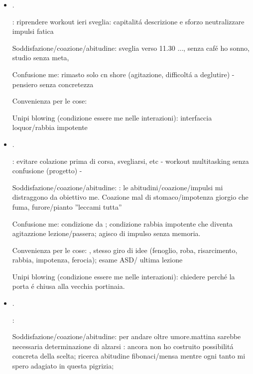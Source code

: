 \begin{itemize}
Convenienza per le cose: mi sono ri-svegliato alle 11 di , workout descrizione condizione (svegliato da vigili urbani,  senza sprecare dolore ad ogni stimolo

Unipi blowing (condizione essere me nelle interazioni): intenzione dettata da .

\item {}.

: riprendere workout ieri sveglia: capitalit\'a descrizione e sforzo neutralizzare impulsi fatica

Soddisfazione/coazione/abitudine: sveglia verso 11.30 ..., senza caf\'e ho sonno, studio senza meta,

Confusione me: rimasto solo cn shore (agitazione, difficolt\'a a deglutire) - pensiero senza concretezza

Convenienza per le cose:

Unipi blowing (condizione essere me nelle interazioni): interfaccia loquor/rabbia impotente

\item {}.

: evitare colazione prima di corsa, svegliarsi, etc - workout multitasking senza confusione (progetto) -  

Soddisfazione/coazione/abitudine: : le abitudini/coazione/impulsi mi distraggono da obiettivo me. Coazione mal di stomaco/impotenza giorgio che fuma, furore/pianto ''leccami tutta''

Confusione me: condizione da ; condizione rabbia impotente che diventa agitazzione lezione/passera; agisco di impulso senza memoria.

Convenienza per le cose: , stesso giro di idee (fenoglio, roba, risarcimento, rabbia, impotenza, ferocia); esame ASD/ ultima lezione

Unipi blowing (condizione essere me nelle interazioni): chiedere perch\'e la porta \'e chiusa alla vecchia portinaia.

\item {}.

:

Soddisfazione/coazione/abitudine: per andare oltre umore.mattina sarebbe necessaria determinazione di alzarsi : ancora non ho costruito possibilit\'a concreta della scelta; ricerca abitudine fibonaci/mensa mentre ogni tanto mi spero adagiato in questa pigrizia;


\end{itemize}
